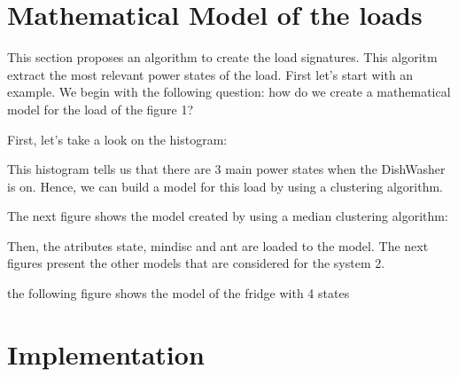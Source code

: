 

\appendix
\chapter{Mathematical Model of the loads}

This section proposes an algorithm to create the load signatures. This algoritm extract the most relevant power states of the load. First let’s start with an example. We begin with the following question: how do we create a mathematical model for the load of the figure 1?



First, let’s take a look on the histogram:

This histogram tells us that there are 3 main power states when the DishWasher is on. Hence, we can build a model for this load by using a clustering algorithm. 



The next figure shows the model created by using a median clustering algorithm:

Then, the atributes state, mindisc and ant are loaded to the model. The next figures present the other models that are considered for the system 2. 






the following figure shows the model of the fridge with 4 states


\chapter{Implementation}

